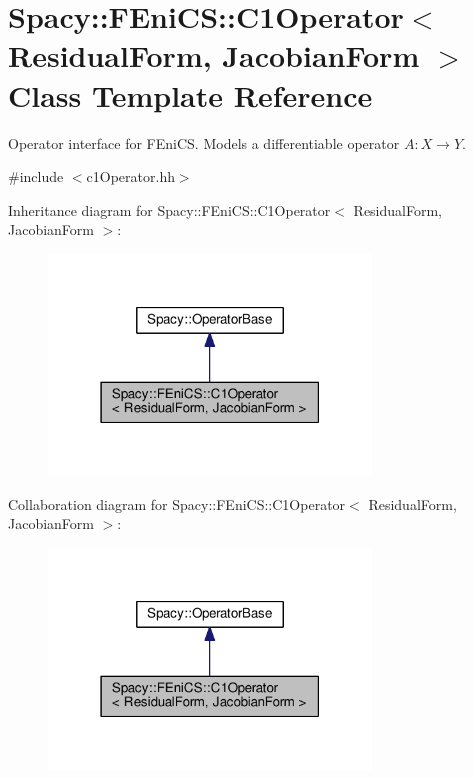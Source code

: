 \hypertarget{classSpacy_1_1FEniCS_1_1C1Operator}{}\section{Spacy\+:\+:F\+Eni\+C\+S\+:\+:C1\+Operator$<$ Residual\+Form, Jacobian\+Form $>$ Class Template Reference}
\label{classSpacy_1_1FEniCS_1_1C1Operator}


Operator interface for F\+Eni\+C\+S. Models a differentiable operator $A:X\rightarrow Y$.  




{\ttfamily \#include $<$c1\+Operator.\+hh$>$}



Inheritance diagram for Spacy\+:\+:F\+Eni\+C\+S\+:\+:C1\+Operator$<$ Residual\+Form, Jacobian\+Form $>$\+:\nopagebreak
\begin{figure}[H]
\begin{center}
\leavevmode
\includegraphics[width=243pt]{classSpacy_1_1FEniCS_1_1C1Operator__inherit__graph}
\end{center}
\end{figure}


Collaboration diagram for Spacy\+:\+:F\+Eni\+C\+S\+:\+:C1\+Operator$<$ Residual\+Form, Jacobian\+Form $>$\+:\nopagebreak
\begin{figure}[H]
\begin{center}
\leavevmode
\includegraphics[width=243pt]{classSpacy_1_1FEniCS_1_1C1Operator__coll__graph}
\end{center}
\end{figure}
